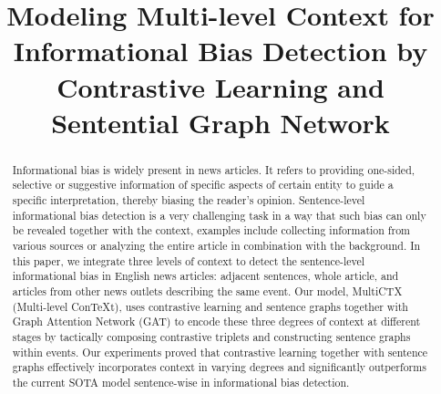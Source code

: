 \documentclass[sigconf,authordraft,anonymous]{acmart}
\begin{document}
\title[Multi-level Context for Informational Bias Detection by Contrastive Learning and GAT]{Modeling Multi-level Context for Informational Bias Detection by 
Contrastive Learning and Sentential Graph Network}






\begin{abstract}
Informational bias is widely present in news articles. 
It refers to providing one-sided, selective or suggestive information of specific aspects of certain entity to guide a specific interpretation, thereby biasing the reader's opinion. Sentence-level informational bias detection is a very challenging task in a way that such bias can only be revealed together with the context, examples include collecting information from various sources or analyzing the entire article in combination with the background. In this paper, we integrate three levels of context to detect the sentence-level informational bias in English news articles: adjacent sentences, whole article, and articles from other news outlets describing the same event. Our model, MultiCTX (Multi-level ConTeXt), uses contrastive learning and sentence graphs together with Graph Attention Network (GAT) to encode these three degrees of context at different stages by tactically composing contrastive triplets and constructing sentence graphs within events. Our experiments proved that contrastive learning together with sentence graphs effectively incorporates context in varying degrees and significantly outperforms the current SOTA model sentence-wise in informational bias detection.
\end{abstract}
\end{document}
